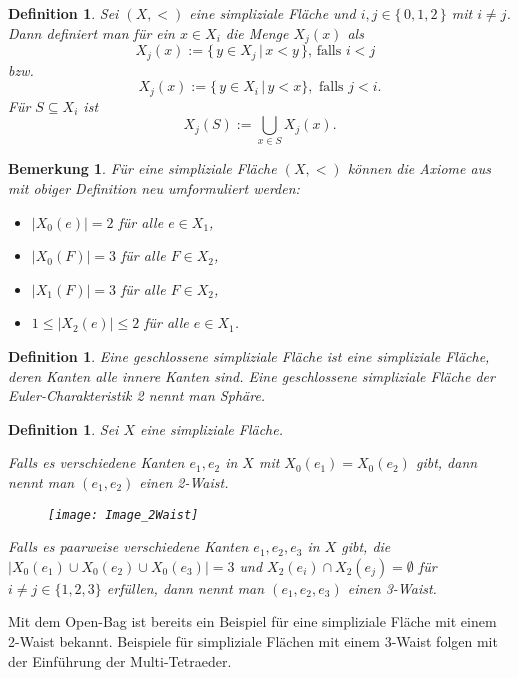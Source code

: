 \documentclass[12pt,titlepage,twoside,cleardoublepage]{article}
\theoremstyle{nummermitklammern}
\newtheorem{definition}[temp]{Definition}
\newtheorem{bemerkung}[temp]{Bemerkung}
\newtheorem{definition}[zahl]{Definition}
\newtheorem{bemerkung}[zahl]{Bemerkung}
\numberwithin{equation}{section}
\begin{document}
\begin{definition} 
Sei $(X,<)$ eine simpliziale Fläche und $i,j \in \{\,0,1,2\,\}$ mit $i \neq j$. Dann definiert man für ein $x \in X_{i}$ die Menge $X_{j}(x)$ als
\[
X_{j}(x):=\{\,y \in X_{j}\,|\,x < y\,\} \text{, falls $i < j$  }
\]
bzw. 
\[
X_{j}(x):=\{\,y \in X_{i}\,|\,y < x\}, \text{ falls $j<i$}.
\]
Für $S \subseteq X_{i}$ ist 
\[
X_j(S):= \bigcup_{x\in S}X_{j}(x).
\]
\end{definition}
\begin{bemerkung}
Für eine simpliziale Fläche $(X,<)$ können die Axiome aus  mit obiger Definition neu umformuliert werden:
\begin{itemize}
\item $\vert X_{0}(e)\vert=2$ für alle $e \in X_{1}$,
\item $\vert X_{0}(F)\vert=3$ für alle $F \in X_{2}$,
\item $\vert X_{1}(F)\vert=3$ für alle $F \in X_{2}$,
\item $1\leq  \vert X_{2}(e)\vert \leq 2$ für alle $e \in X_{1}$.

\end{itemize}
\end{bemerkung}
\begin{definition}  Eine \emph{geschlossene} simpliziale Fläche ist eine simpliziale Fläche, deren Kanten alle innere Kanten sind. Eine geschlossene simpliziale Fläche der Euler-Charakteristik  2 nennt man \emph{Sphäre}.
\end{definition} 
\begin{definition}
Sei $X$ eine simpliziale Fläche.

 Falls es verschiedene Kanten $e_1,e_2$ in $X$ mit $X_0(e_1)=X_0(e_2)$ gibt, dann nennt man $(e_1,e_2)$ einen 2-Waist.
 \begin{figure}[H]
\begin{center}
\texttt{[image: Image\_2Waist]}
\end{center}
\end{figure} 
 Falls es paarweise verschiedene Kanten $e_1,e_2,e_3$ in $X$ gibt, die $\vert X_0(e_1)\cup X_0(e_2)\cup X_0(e_3) \vert=3$ und $X_2(e_i)\cap X_2(e_j)=\emptyset$ für $i \neq j\in\{1,2,3\}  $ erfüllen, dann nennt man $(e_1,e_2,e_3)$ einen 3-Waist. 
\end{definition}
Mit dem Open-Bag ist bereits ein Beispiel für eine simpliziale Fläche mit einem 2-Waist bekannt. Beispiele für simpliziale Flächen mit einem 3-Waist folgen mit der Einführung der Multi-Tetraeder. 
\end{document}
